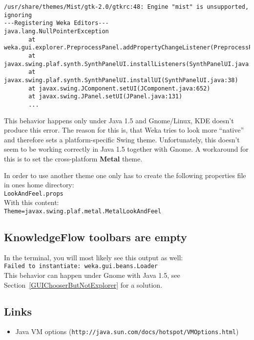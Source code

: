 \begin{verbatim}
/usr/share/themes/Mist/gtk-2.0/gtkrc:48: Engine "mist" is unsupported, ignoring
---Registering Weka Editors---
java.lang.NullPointerException
       at weka.gui.explorer.PreprocessPanel.addPropertyChangeListener(PreprocessPanel.java:519)
       at javax.swing.plaf.synth.SynthPanelUI.installListeners(SynthPanelUI.java:49)
       at javax.swing.plaf.synth.SynthPanelUI.installUI(SynthPanelUI.java:38)
       at javax.swing.JComponent.setUI(JComponent.java:652)
       at javax.swing.JPanel.setUI(JPanel.java:131) 
       ...
\end{verbatim}

\noindent This behavior happens only under Java 1.5 and Gnome/Linux,
KDE doesn't produce this error. The reason for this is, that Weka
tries to look more ``native'' and therefore sets a platform-specific
Swing theme. Unfortunately, this doesn't seem to be working correctly
in Java 1.5 together with Gnome. A workaround for this is to set the
cross-platform \textbf{Metal} theme.

In order to use another theme one only has to create the following
properties file in ones home directory:\\

\verb=LookAndFeel.props=\\

\noindent With this content:\\

\verb^Theme=javax.swing.plaf.metal.MetalLookAndFeel^\\

\subsection{KnowledgeFlow toolbars are empty}
In the terminal, you will most likely see this output as well:\\

\verb=Failed to instantiate: weka.gui.beans.Loader=\\

\noindent This behavior can happen under Gnome with Java 1.5, see
Section~\ref{GUIChooserButNotExplorer} for a solution.

\subsection{Links}
\begin{itemize}
\item Java VM options (\verb=http://java.sun.com/docs/hotspot/VMOptions.html=)
\end{itemize}


